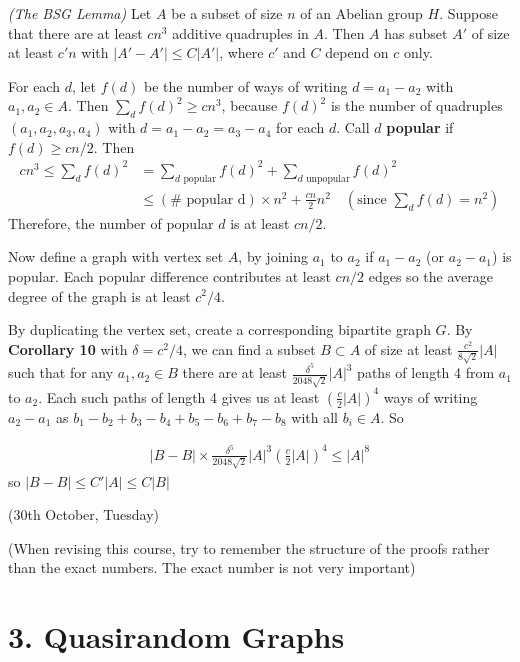 \documentclass[12pt,a4paper]{report}
\newenvironment{proof}
{\begin{changemargin}{1cm}{0.5cm}
	}%
	{\end{changemargin}
}
\begin{document}
 \emph{(The BSG Lemma)} Let $A$ be a subset of size $n$ of an Abelian group $H$. Suppose that there are at least $cn^3$ additive quadruples in $A$. Then $A$ has subset $A'$ of size at least $c'n$ with $|A'-A'| \leq C|A'|$, where $c'$ and $C$ depend on $c$ only.
\begin{proof}
\pf For each $d$, let $f(d)$ be the number of ways of writing $d = a_1 -a_2$ with $a_1, a_2 \in A$. Then $\sum_d f(d)^2 \geq cn^3$, because $f(d)^2$ is the number of quadruples $(a_1,a_2, a_3, a_4)$ with $d=a_1 - a_2 = a_3 - a_4$ for each $d$. Call $d$ \textbf{popular} if $f(d)\geq cn/2$. Then
\begin{align*}
cn^3 \leq \sum_d f(d)^2 &= \sum_{d \text{ popular}} f(d)^2 + \sum_{d \text{ unpopular}} f(d)^2 \\
&\leq ( \# \text{ popular d}) \times n^2 + \frac{cn}{2} n^2 \quad (\text{since } \sum_d f(d) = n^2)
\end{align*}
Therefore, the number of popular $d$ is at least $cn/2$.

\quad Now define a graph with vertex set $A$, by joining $a_1$ to $a_2$ if $a_1 -a_2$ (or $a_2 -a_1$) is popular. Each popular difference contributes at least $cn/2$ edges so the average degree of the graph is at least $c^2/4$.

\quad By duplicating the vertex set, create a corresponding bipartite graph $G$. By \textbf{Corollary 10} with $\delta = c^2/4$, we can find a subset $B\subset A$ of size at least $\frac{c^2}{8\sqrt{2}} |A|$ such that for any $a_1,a_2 \in B$ there are at least $\frac{\delta^5}{2048\sqrt{2}} |A|^3$ paths of length 4 from $a_1$ to $a_2$. Each such paths of length 4 gives us at least $(\frac{c}{2}|A|)^4$ ways of writing $a_2 -a_1$ as $b_1 -b_2 + b_3 -b_4 +b_5 -b_6 +b_7 -b_8$ with all $b_i \in A$. So

\begin{align*}
|B-B| \times \frac{\delta^5}{2048 \sqrt{2}} |A|^3 (\frac{c}{2}|A|)^4 \leq |A|^8
\end{align*}
so $|B-B|\leq C'|A| \leq C|B|$

\eop
\end{proof}
\s

\newday

(30th October, Tuesday)
\s

(When revising this course, try to remember the structure of the proofs rather than the exact numbers. The exact number is not very important)

\section*{3. Quasirandom Graphs}
\end{document}
